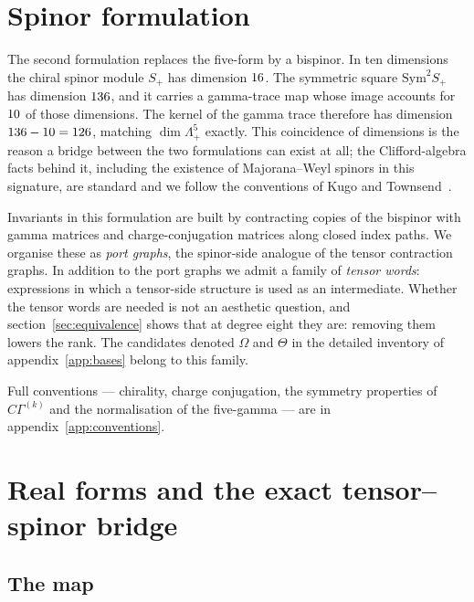 \documentclass[11pt,a4paper]{article}
\theoremstyle{definition}
\theoremstyle{remark}
\begin{document}
\section{Spinor formulation}
\label{sec:spinor}

The second formulation replaces the five-form by a bispinor. In ten dimensions
the chiral spinor module $S_+$ has dimension $16$. The symmetric square
$\mathrm{Sym}^2 S_+$ has dimension $136$, and it carries a gamma-trace
map whose image accounts for $10$ of those dimensions. The kernel of
the gamma trace therefore has dimension
$136 - 10 = 126$, matching
$\dim \Lambda^5_+$ exactly. This coincidence of dimensions is the reason a bridge
between the two formulations can exist at all; the Clifford-algebra facts behind
it, including the existence of Majorana--Weyl spinors in this signature, are
standard and we follow the conventions of Kugo and
Townsend~\cite{Kugo:1982bn}.

Invariants in this formulation are built by contracting copies of the bispinor
with gamma matrices and charge-conjugation matrices along closed index paths. We
organise these as \emph{port graphs}, the spinor-side analogue of the tensor
contraction graphs. In addition to the port graphs we admit a family of
\emph{tensor words}: expressions in which a tensor-side structure is used as an
intermediate. Whether the tensor words are needed is not an aesthetic question,
and section~\ref{sec:equivalence} shows that at degree eight they are: removing
them lowers the rank. The candidates denoted $\Omega$ and $\Theta$ in the
detailed inventory of appendix~\ref{app:bases} belong to this family.

Full conventions --- chirality, charge conjugation, the symmetry properties of
$C\Gamma^{(k)}$ and the normalisation of the five-gamma --- are in
appendix~\ref{app:conventions}.

\section{Real forms and the exact tensor--spinor bridge}
\label{sec:bridge}

\subsection{The map}
\end{document}
